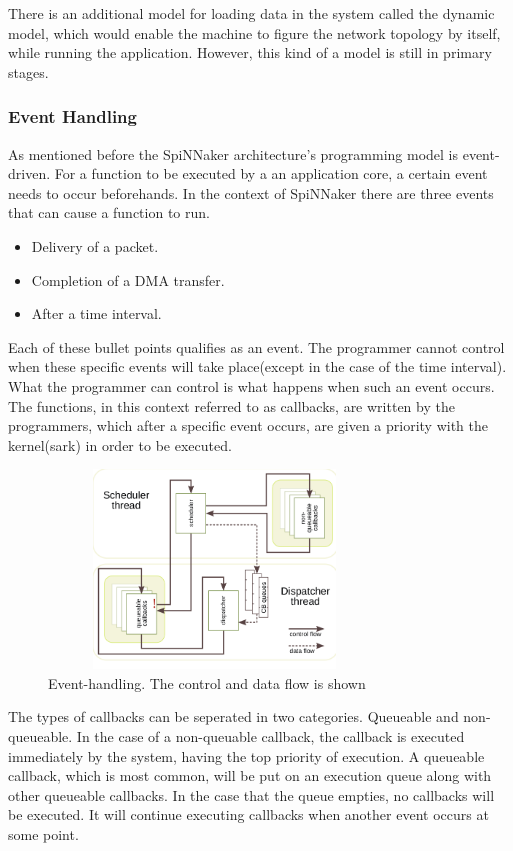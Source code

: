 \documentclass[12pt,a4paper]{article}
\begin{document}
There is an additional model for loading data in the system called the dynamic model, which would enable the machine to figure the network topology by itself, while running the application. However, this kind of a model is still in primary stages\cite{docfile}.
\subsubsection{Event Handling}
As mentioned before the SpiNNaker architecture's programming model is event-driven. For a function to be executed by a an application core, a certain event needs to occur beforehands. In the context of SpiNNaker there are three events that can cause a function to run.
\begin{itemize}
\item Delivery of a packet.
\item Completion of a DMA transfer.
\item After a time interval.
\end{itemize}
Each of these bullet points qualifies as an event. The programmer cannot control when these specific events will take place(except in the case of the time interval). What the programmer can control is what happens when such an event occurs. The functions, in this context referred to as callbacks, are written by the programmers, which after a specific event occurs, are given a priority with the kernel(sark) in order to be executed. 
\begin{figure}[h!]
\includegraphics[width=250pt,height=150pt,scale=2]{Pics/event-handling.png}
\centering
\caption{Event-handling. The control and data flow is shown\cite{sharp2011event}}
\end{figure}

The types of callbacks can be seperated in two categories. Queueable and non-queueable. In the case of a non-queuable callback, the callback is executed immediately by the system, having the top priority of execution. A queueable callback, which is most common, will be put on an execution queue along with other queueable callbacks. In the case that the queue empties, no callbacks will be executed. It will continue executing callbacks when another event occurs at some point\cite{sharp2011event}\cite{rast2012managing}. 
	
\end{document}
